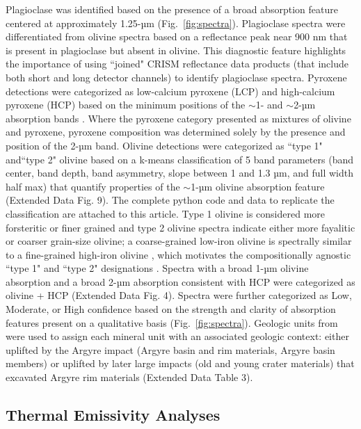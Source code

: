 \documentclass[12pt]{article}
\begin{document}
Plagioclase was identified based on the presence of a broad absorption feature centered at approximately 1.25-µm (Fig.~\ref{fig:spectra}). Plagioclase spectra were differentiated from olivine spectra based on a reflectance peak near 900 nm that is present in plagioclase but absent in olivine. This diagnostic feature highlights the importance of using ``joined" CRISM reflectance data products (that include both short and long detector channels) to identify plagioclase spectra. Pyroxene detections were categorized as low-calcium pyroxene (LCP) and high-calcium pyroxene (HCP) based on the minimum positions of the $\sim$1- and $\sim$2-µm absorption bands \citep{Viviano2014}. Where the pyroxene category presented as mixtures of olivine and pyroxene, pyroxene composition was determined solely by the presence and position of the 2-µm band. Olivine detections were categorized as ``type 1" and``type 2" olivine \citep{Ody2013} based on a k-means classification of 5 band parameters (band center, band depth, band asymmetry, slope between 1 and 1.3 µm, and full width half max) that quantify properties of the $\sim$1-µm olivine absorption feature (Extended Data Fig. 9). The complete python code and data to replicate the classification are attached to this article. Type 1 olivine is considered more forsteritic or finer grained and type 2 olivine spectra indicate either more fayalitic or coarser grain-size olivine; a coarse-grained low-iron olivine is spectrally similar to a fine-grained high-iron olivine \citep[e.g.,][]{Mustard2005}, which motivates the compositionally agnostic ``type 1" and ``type 2" designations \citep{Ody2013}. Spectra with a broad 1-µm olivine absorption and a broad 2-µm absorption consistent with HCP were categorized as olivine + HCP (Extended Data Fig. 4). Spectra were further categorized as Low, Moderate, or High confidence based on the strength and clarity of absorption features present on a qualitative basis (Fig.~\ref{fig:spectra}). Geologic units from \citet{Dohm2015} were used to assign each mineral unit with an associated geologic context: either uplifted by the Argyre impact (Argyre basin and rim materials, Argyre basin members) or uplifted by later large impacts (old and young crater materials) that excavated Argyre rim materials (Extended Data Table 3).

\subsection*{Thermal Emissivity Analyses}
\end{document}

